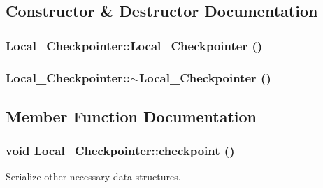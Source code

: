 \subsection{Constructor \& Destructor Documentation}
\hypertarget{class_local___checkpointer_aade758e515038c5c20b3ea4cb64e0732}{
\subsubsection[{Local\_\-Checkpointer}]{\setlength{\rightskip}{0pt plus 5cm}Local\_\-Checkpointer::Local\_\-Checkpointer ()}}
\label{class_local___checkpointer_aade758e515038c5c20b3ea4cb64e0732}
\hypertarget{class_local___checkpointer_a62ad6f9cfea93826687e138f98182e2f}{
\subsubsection[{$\sim$Local\_\-Checkpointer}]{\setlength{\rightskip}{0pt plus 5cm}Local\_\-Checkpointer::$\sim$Local\_\-Checkpointer ()}}
\label{class_local___checkpointer_a62ad6f9cfea93826687e138f98182e2f}


\subsection{Member Function Documentation}
\hypertarget{class_local___checkpointer_aa271d3a80545d6a962c959c82fa7b7c7}{
\subsubsection[{checkpoint}]{\setlength{\rightskip}{0pt plus 5cm}void Local\_\-Checkpointer::checkpoint ()}}
\label{class_local___checkpointer_aa271d3a80545d6a962c959c82fa7b7c7}


Serialize other necessary data structures. 



